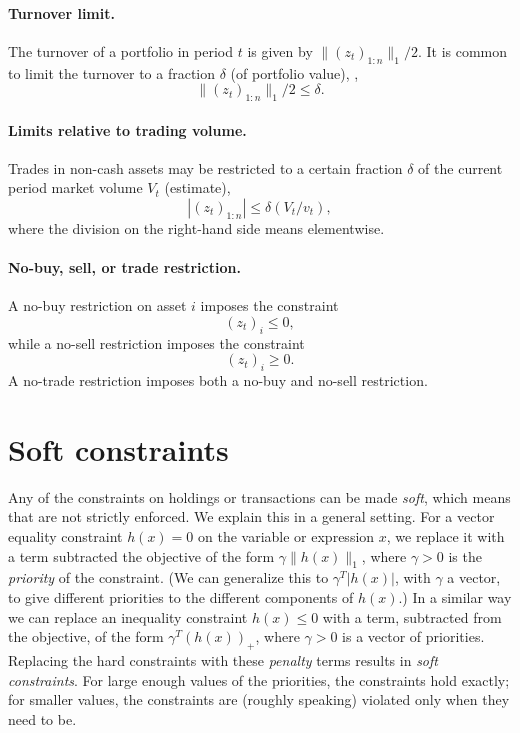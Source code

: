 \documentclass[openany]{article}  %
\begin{document}
\paragraph{Turnover limit.}
The turnover of a portfolio in period $t$ is given by $\|(z_t)_{1:n}\|_1/2$.
It is common to limit the turnover to a fraction $\delta$ (of portfolio value),
\ie,
\[
\|(z_t)_{1:n}\|_1/2 \leq \delta.
\]

\paragraph{Limits relative to trading volume.}
Trades in non-cash assets may be restricted to a certain fraction
$\delta$ of the current period market volume $V_t$ (estimate),
\[
|(z_t)_{1:n}| \leq \delta (V_t/v_t),
\]
where the division on the right-hand side means elementwise.

\paragraph{No-buy, sell, or trade restriction.}
A no-buy restriction on asset $i$ imposes the constraint
\[
(z_t)_i \leq 0,
\]
while a no-sell restriction imposes the constraint
\[
(z_t)_i \geq 0.
\]
A no-trade restriction imposes both a no-buy and no-sell restriction.

\section{Soft constraints}
Any of the constraints on holdings or transactions can be made \emph{soft},
which means that are not strictly enforced.
We explain this in a general setting.
For a vector equality constraint $h(x)=0$ on the variable or expression $x$, we replace
it with a term subtracted the objective of the form
$\gamma \|h(x)\|_1$,
where $\gamma > 0$ is the \emph{priority} of the constraint.
(We can generalize this to $\gamma^T |h(x)|$, with $\gamma$ a vector, to give
different priorities to the different components of $h(x)$.)
In a similar way we can replace an inequality constraint $h(x)\leq 0$ with
a term, subtracted from the objective, of the form $\gamma^T(h(x))_+$,
where $\gamma >0$ is a vector of priorities.
Replacing the hard constraints with these \emph{penalty} terms results in
\emph{soft constraints}.  For large enough values of the priorities, the
constraints hold exactly; for smaller values, the constraints are (roughly speaking)
violated only when they need to be.
\end{document}
